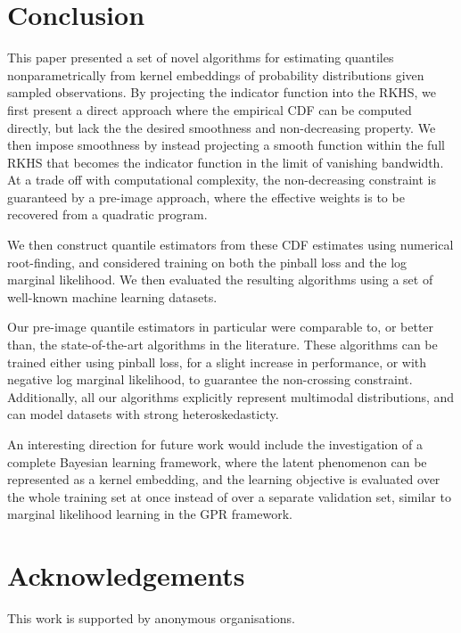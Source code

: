 \documentclass[twoside]{article} \usepackage{aistats2017}
\theoremstyle{definition}
\theoremstyle{theorem}
\begin{document}
\section{Conclusion}
\label{sec:conclusion}
	
	This paper presented a set of novel algorithms for estimating quantiles nonparametrically from kernel embeddings of probability distributions given sampled observations. By projecting the indicator function into the RKHS, we first present a direct approach where the empirical CDF can be computed directly, but lack the the desired smoothness and non-decreasing property. We then impose smoothness by instead projecting a smooth function within the full RKHS that becomes the indicator function in the limit of vanishing bandwidth. At a trade off with computational complexity, the non-decreasing constraint is guaranteed by a pre-image approach, where the effective weights is to be recovered from a quadratic program.
	
	We then construct quantile estimators from these CDF estimates using numerical root-finding, and considered training on both the pinball loss and the log marginal likelihood. We then evaluated the resulting algorithms using a set of well-known machine learning datasets.
	
	Our pre-image quantile estimators in particular were comparable to, or better than, the state-of-the-art algorithms in the literature. These algorithms can be trained either using pinball loss, for a slight increase in performance, or with negative log marginal likelihood, to guarantee the non-crossing constraint. Additionally, all our algorithms explicitly represent multimodal distributions, and can model datasets with strong heteroskedasticty.
	
	An interesting direction for future work would include the investigation of a complete Bayesian learning framework, where the latent phenomenon can be represented as a kernel embedding, and the learning objective is evaluated over the whole training set at once instead of over a separate validation set, similar to marginal likelihood learning in the GPR framework.

\section*{Acknowledgements}

	This work is supported by anonymous organisations.


\end{document}
